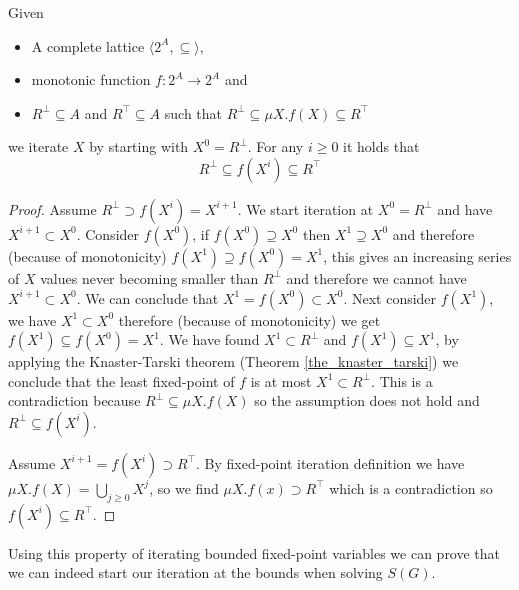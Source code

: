 \begin{lemma}
	\label{lem_fixpoint_bounds_mu}
	Given
	\begin{itemize}
		\item A complete lattice $\langle 2^A, \subseteq \rangle$,
		\item monotonic function $f : 2^A \rightarrow 2^A$ and
		\item $R^\bot \subseteq A$ and $R^\top \subseteq A$ such that $R^\bot \subseteq \mu X. f(X) \subseteq R^\top$
	\end{itemize}
	we iterate $X$ by starting with $X^0 = R^\bot$. For any $i \geq 0$ it holds that
	\[ R^\bot \subseteq f(X^i) \subseteq R^\top \]
	\begin{proof}
		Assume $R^\bot \supset f(X^i) = X^{i+1}$. We start iteration at $X^0 = R^\bot$ and have $X^{i+1} \subset X^0$. Consider $f(X^0)$, if $f(X^0) \supseteq X^0$ then $X^1 \supseteq X^0$ and therefore (because of monotonicity) $f(X^1) \supseteq f(X^0) = X^1$, this gives an increasing series of $X$ values never becoming smaller than $R^\bot$ and therefore we cannot have $X^{i+1} \subset X^0$. We can conclude that $X^1 = f(X^0) \subset X^0$. Next consider $f(X^1)$, we have $X^1 \subset X^0$ therefore (because of monotonicity) we get $f(X^1) \subseteq f(X^0) = X^1$. We have found $X^1 \subset R^\bot$ and $f(X^1) \subseteq X^1$, by applying the Knaster-Tarski theorem (Theorem \ref{the_knaster_tarski}) we conclude that the least fixed-point of $f$ is at most $X^1 \subset R^\bot$. This is a contradiction because $R^\bot \subseteq \mu X.f(X)$ so the assumption does not hold and $R^\bot \subseteq f(X^i)$.
		
		Assume $X^{i+1} = f(X^i) \supset R^\top$. By fixed-point iteration definition we have $\mu X.f(X) = \bigcup_{j\geq0}X^j$, so we find $\mu X.f(x) \supset R^\top $ which is a contradiction so $f(X^i) \subseteq R^\top$.
	\end{proof}
\end{lemma}
Using this property of iterating bounded fixed-point variables we can prove that we can indeed start our iteration at the bounds when solving $S(G)$.
